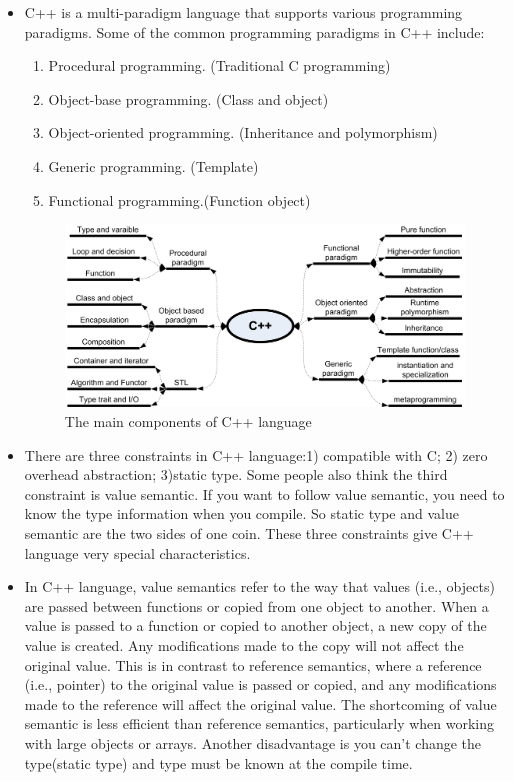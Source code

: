 \documentclass[a4paper,11pt,twoside]{book}
\begin{document}
\begin{itemize}
	\item C++ is a multi-paradigm language that supports various programming paradigms. Some of the common programming paradigms in C++ include:
	\begin{enumerate}
		\item Procedural programming. (Traditional C programming)
		\item Object-base programming. (Class and object)
		\item Object-oriented programming. (Inheritance and polymorphism)
		\item Generic programming. (Template)
		\item Functional programming.(Function object)
	\end{enumerate}
	
	\begin{figure}[h]
		\centering
		\includegraphics[width=0.95\linewidth]{pics/whole.png}
		\caption{The main components of C++ language}
		\label{fig:whole}
	\end{figure}

    \item There are three constraints in C++ language:1) compatible with C; 2) zero overhead abstraction; 3)static type. Some people also think the third constraint is value semantic. If you want to follow value semantic, you need to know the type information when you compile. So static type and value semantic are the two sides of one coin. These three constraints give C++ language very special characteristics. 
    
    \item In C++ language, value semantics refer to the way that values (i.e., objects) are passed between functions or copied from one object to another. When a value is passed to a function or copied to another object, a new copy of the value is created. Any modifications made to the copy will not affect the original value. This is in contrast to reference semantics, where a reference (i.e., pointer) to the original value is passed or copied, and any modifications made to the reference will affect the original value. The shortcoming of value semantic is less efficient than reference semantics, particularly when working with large objects or arrays. Another disadvantage is you can't change the type(static type) and type must be known at the compile time.
\end{itemize}
\end{document}
